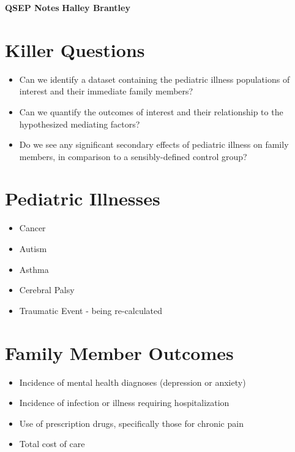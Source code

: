 \documentclass[a4paper, 11pt]{article}
\begin{document}
	\noindent
	\normalsize
	\setlength{\parindent}{0em}
	\large\textbf{QSEP Notes} \hfill \textbf{Halley Brantley} \\
	
	\section*{Killer Questions}
	
	\begin{itemize}
 	\item Can we identify a dataset containing the pediatric illness populations of interest and their immediate family members? 
	\item Can we quantify the outcomes of interest and their relationship to the hypothesized mediating factors? 
	\item Do we see any significant secondary effects of pediatric illness on family members, in comparison to a sensibly-defined control group? 
	\end{itemize}
	
	\section*{Pediatric Illnesses}
	\begin{itemize}
		\item Cancer
		\item Autism
		\item Asthma
		\item Cerebral Palsy
		\item Traumatic Event - being re-calculated
	\end{itemize}
	
	\section*{Family Member Outcomes}
	\begin{itemize}
		\item	Incidence of mental health diagnoses (depression or anxiety) 
		\item	Incidence of infection or illness requiring hospitalization
		\item	Use of prescription drugs, specifically those for chronic pain 
		\item	Total cost of care 		
	\end{itemize}
\end{document}
